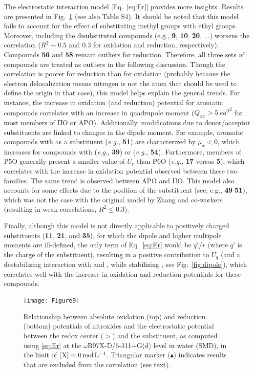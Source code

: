 \documentclass[review,preprint]{elsarticle}
\begin{document}
The electrostatic interaction model [Eq.~\eqref{eq:Er}] provides more insights. Results are presented in Fig.~\ref{fig:corr} (see also Table S4). It should be noted that this model fails to account for the effect of substituting methyl groups with ethyl groups. Moreover, including the disubstituted compounds (e.g., \textbf{9}, \textbf{10}, \textbf{20}, ...) worsens the correlation ($R^2 \sim 0.5$ and 0.3 for oxidation and reduction, respectively). Compounds \textbf{56} and \textbf{58} remain outliers for reduction. Therefore, all three sets of compounds are treated as outliers in the following discussion.
Though the correlation is poorer for reduction than for oxidation (probably because the electron delocalization means nitrogen is not the atom that should be used to define the origin in that case), this model helps explain the general trends. For instance, the increase in oxidation (and reduction) potential for aromatic compounds correlates with an increase in quadrupole moment ($Q_{xx} > \SI{5}{\elementarycharge\bohr\squared}$ for most members of IIO or APO). Additionally, modifications due to donor/acceptor substituents are linked to changes in the dipole moment. For example, aromatic compounds with  as a substituent (\textit{e.g.}, \textbf{51}) are characterized by $\mu_{x} < 0$, which increases for compounds with  (\textit{e.g.}, \textbf{39}) or  (\textit{e.g.}, \textbf{54}). Furthermore, members of P5O generally present a smaller value of $U_r$ than P6O (\textit{e.g.}, \textbf{17} versus \textbf{5}), which correlates with the increase in oxidation potential observed between these two families. The same trend is observed between APO and IIO.
This model also accounts for some effects due to the position of the substituent (see, e.g., \textbf{49}-\textbf{51}), which was not the case with the original model by Zhang and co-workers (resulting in weak correlations, $R^2 \leq 0.3$). 

Finally, although this model is not directly applicable to positively charged substituents (\textbf{11}, \textbf{21}, and \textbf{35}), for which the dipole and higher multipole moments are ill-defined, the only term of Eq.~\eqref{eq:Er}  would be $q'/r$ (where $q'$ is the charge of the substituent), resulting in a positive contribution to $U_q$ (and a destabilizing interaction with  and , while stabilizing , see Fig.~\ref{fig:dipole}), which correlates well with the increase in oxidation and reduction potentials for these compounds.


\begin{figure}[!h]
\centering
\texttt{[image: Figure9]}
\caption{Relationship between absolute oxidation (top) and reduction (bottom) potentials of nitroxides and the electrostatic potential between the redox center ($>$) and the substituent, as computed using \eqref{eq:Er} at the $\omega$B97X-D/6-311+G(d) level in water (SMD), in the limit of $[\ce{X}]=\SI{0}{\mole\per\liter}$. Triangular marker ($\blacktriangle$) indicates results that are excluded from the correlation (see text).}
\label{fig:corr} 
\end{figure}
\end{document}
